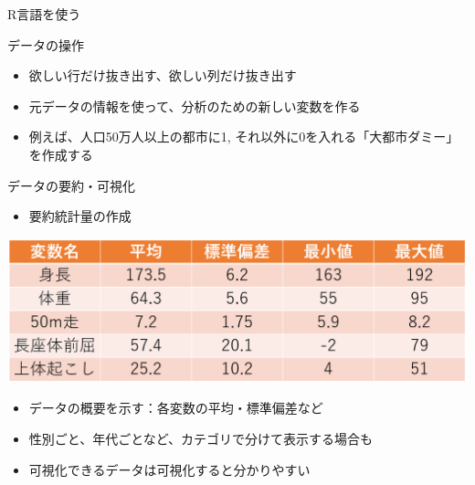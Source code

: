 \documentclass[
  ignorenonframetext,
]{beamer}
\providecommand{\tightlist}{%
  \setlength{\itemsep}{0pt}\setlength{\parskip}{0pt}}
\begin{document}
\begin{frame}[fragile]{R言語を使う}
\begin{block}{データの操作}
\begin{itemize}
  \begin{itemize}
  \tightlist
  \item
    欲しい行だけ抜き出す、欲しい列だけ抜き出す
  \item
    元データの情報を使って、分析のための新しい変数を作る
  \item
    例えば、人口50万人以上の都市に1,
    それ以外に0を入れる「大都市ダミー」を作成する
  \end{itemize}
\end{itemize}
\end{block}

\begin{block}{データの要約・可視化}
\protect\hypertarget{ux30c7ux30fcux30bfux306eux8981ux7d04ux53efux8996ux5316}{}
\begin{itemize}
\tightlist
\item
  要約統計量の作成
\end{itemize}

\begin{center}\includegraphics[width=0.8\linewidth]{figs/summary_ex} \end{center}

\begin{itemize}
\tightlist
\item
  データの概要を示す：各変数の平均・標準偏差など
\item
  性別ごと、年代ごとなど、カテゴリで分けて表示する場合も
\item
  可視化できるデータは可視化すると分かりやすい
\end{itemize}
\end{block}


\end{frame}
\end{document}
